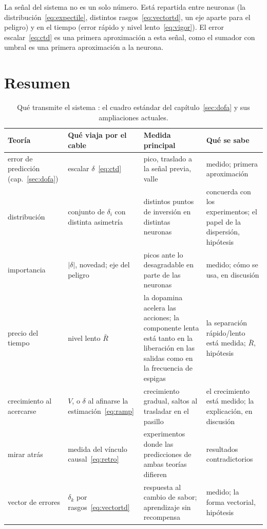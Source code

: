 \begin{keyblock}
\begin{proposition}
\label{prop:bundle}
La señal del sistema  no es un solo número. Está repartida entre neuronas (la distribución~\eqref{eq:expectile}, distintos rasgos~\eqref{eq:vectortd}, un eje aparte para el peligro) y en el tiempo (error rápido y nivel lento~\eqref{eq:vigor}). El error escalar~\eqref{eq:ctd} es una primera aproximación a esta señal, como el sumador con umbral es una primera aproximación a la neurona.
\end{proposition}
\end{keyblock}

\section{Resumen}

\begin{table}[t]
\centering
\footnotesize
\setlength{\tabcolsep}{4pt}
\renewcommand{\arraystretch}{1.15}
\begin{tabular}{>{\raggedright}p{2.5cm}>{\raggedright}p{3.2cm}>{\raggedright}p{3.6cm}>{\raggedright\arraybackslash}p{4.2cm}}
\toprule
Teoría & Qué viaja por el cable & Medida principal & Qué se sabe \\
\midrule
error de predicción (cap.~\ref{sec:dofa}) & escalar $\delta$~\eqref{eq:ctd} & pico, traslado a la señal previa, valle & medido; primera aproximación \\
distribución & conjunto de $\delta_i$ con distinta asimetría & distintos puntos de inversión en distintas neuronas & concuerda con los experimentos; el papel de la dispersión, hipótesis \\
importancia & $|\delta|$, novedad; eje del peligro & picos ante lo desagradable en parte de las neuronas & medido; cómo se usa, en discusión \\
precio del tiempo & nivel lento $\bar R$ & la dopamina acelera las acciones; la componente lenta está tanto en la liberación en las salidas como en la frecuencia de espigas & la separación rápido/lento está medida; $\bar R$, hipótesis \\
crecimiento al acercarse & $V$, o $\delta$ al afinarse la estimación~\eqref{eq:ramp} & crecimiento gradual, saltos al trasladar en el pasillo & el crecimiento está medido; la explicación, en discusión \\
mirar atrás & medida del vínculo causal~\eqref{eq:retro} & experimentos donde las predicciones de ambas teorías difieren & resultados contradictorios \\
vector de errores & $\delta_k$ por rasgos~\eqref{eq:vectortd} & respuesta al cambio de sabor; aprendizaje sin recompensa & medido; la forma vectorial, hipótesis \\
\bottomrule
\end{tabular}
\caption{Qué transmite el sistema : el cuadro estándar del capítulo~\ref{sec:dofa} y sus ampliaciones actuales.}
\label{tab:dofaalt}
\end{table}

